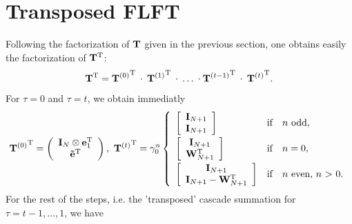 \section{Transposed FLFT}
\label{NFSFT:transposedFLFT}
Following the factorization of $\mathbf{T}$ given in the previous section, one obtains easily the factorization of $\mathbf{T^{\text{\rm{T}}}}$:
\begin{equation}
  \label{NFSFT:transposedFactorization}
  \mathbf{T}^{\text{\rm{T}}} = {\mathbf{T}^{(0)}}^{\text{\rm{T}}} \: \cdot \: {\mathbf{T}^{(1)}}^{\text{\rm{T}}} \: \cdot \: \ldots \: \cdot {\mathbf{T}^{(t-1)}}^{\text{\rm{T}}} \: \cdot \: {\mathbf{T}^{(t)}}^{\text{\rm{T}}}.
\end{equation}
For $\tau = 0$ and $\tau = t$, we obtain immediatly
\[
  {\V{T}^{(0)}}^{\transp} = 
     \left(\begin{array}{c} 
       \V{I}_{N} \otimes \V{e}_{1}^{\transp}\\ 
       \V{\tilde{e}}^{\transp} 
     \end{array}\right),\  
   {\V{T}^{(t)}}^{\transp} = \gamma_{0}^n 
     \left\{\begin{array}{l@{\quad \text{if} \quad}l} 
       \left[ \begin{array}{c} \V{I}_{N+1} \\ \V{I}_{N+1}                         \end{array} \right] & \text{$n$ odd},          \\[2ex]
       \left[ \begin{array}{c} \V{I}_{N+1} \\               \V{W}_{N+1}^{\transp} \end{array} \right] & \text{$n = 0$},          \\[2ex]
       \left[ \begin{array}{c} \V{I}_{N+1} \\ \V{I}_{N+1} - \V{W}_{N+1}^{\transp} \end{array} \right] & \text{$n$ even, $n$ > 0}.
     \end{array}\right.
\]
For the rest of the steps, i.e. the 'transposed' cascade summation for $\tau = t-1,\ldots,1$, we have
